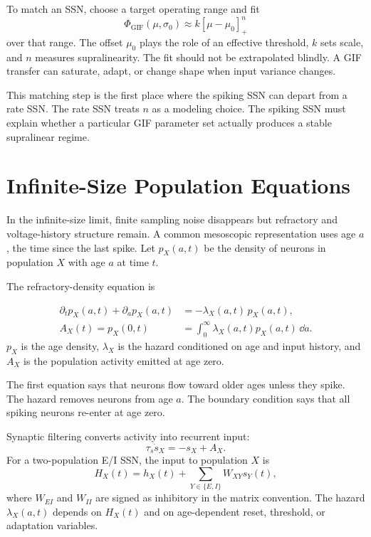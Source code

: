 To match an SSN, choose a target operating range and fit
%
\begin{equation}
  \Phi_{\mathrm{GIF}}(\mu,\sigma_0)
  \approx
  k[\mu-\mu_0]_{+}^{n}
  \label{eq:gif-power-law-fit}
\end{equation}
%
over that range. The offset $\mu_0$ plays the role of an effective threshold, $k$ sets scale, and $n$ measures supralinearity. The fit should not be extrapolated blindly. A GIF transfer can saturate, adapt, or change shape when input variance changes.

This matching step is the first place where the spiking SSN can depart from a rate SSN\@. The rate SSN treats $n$ as a modeling choice. The spiking SSN must explain whether a particular GIF parameter set actually produces a stable supralinear regime.

\section{Infinite-Size Population Equations}
\label{sec:spiking-ssn-infinite-size-population-equations}

In the infinite-size limit, finite sampling noise disappears but refractory and voltage-history structure remain. A common mesoscopic representation uses age $a$, the time since the last spike. Let $p_X(a,t)$ be the density of neurons in population $X$ with age $a$ at time $t$.

The refractory-density equation is
%
\begin{keyequation}
\begin{align}
  \partial_t p_X(a,t)+\partial_a p_X(a,t)
  &=
  -\lambda_X(a,t)\,p_X(a,t),
  \label{eq:gif-age-density}\\
  A_X(t)
  =
  p_X(0,t)
  &=
  \int_0^\infty \lambda_X(a,t)p_X(a,t)\,\dd a.
  \label{eq:gif-boundary-activity}
\end{align}
\tcblower
$p_X$ is the age density, $\lambda_X$ is the hazard conditioned on age and input history, and $A_X$ is the population activity emitted at age zero.
\end{keyequation}
%
The first equation says that neurons flow toward older ages unless they spike. The hazard removes neurons from age $a$. The boundary condition says that all spiking neurons re-enter at age zero.

Synaptic filtering converts activity into recurrent input:
%
\begin{equation}
  \tau_s\dot s_X
  =
  -s_X+A_X.
  \label{eq:gif-synaptic-filter}
\end{equation}
%
For a two-population E/I SSN, the input to population $X$ is
%
\begin{equation}
  H_X(t)
  =
  h_X(t)
  +
  \sum_{Y\in\{E,I\}} W_{XY}s_Y(t),
  \label{eq:gif-ssn-population-input}
\end{equation}
%
where $W_{EI}$ and $W_{II}$ are signed as inhibitory in the matrix convention. The hazard $\lambda_X(a,t)$ depends on $H_X(t)$ and on age-dependent reset, threshold, or adaptation variables.

